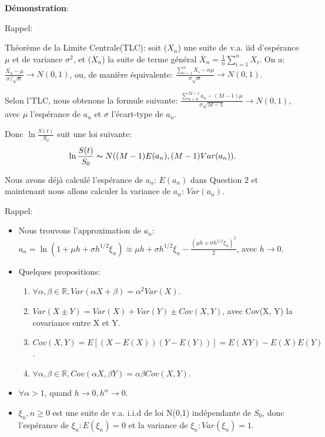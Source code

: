 \documentclass[a4paper,10pt]{report}
\begin{document}
\noindent \textbf{Démonstration}:
\par Rappel:
\par Théorème de la Limite Centrale(TLC): soit ($X_{n}$) une suite de v.a. iid d'espérance $\mu$ et de variance $\sigma^{2}$, et ($\overline X_{n}$) la suite de terme général $\overline X_{n} = \frac{1}{n} \sum_{i=1}^{n} X_{i}$. On a: $\frac{{\overline{X_{n}}} - \mu}{\sigma / \sqrt{n}} \rightarrow N(0,1)$, ou, de manière équivalente: $ \frac{\sum_{i=1}^{n}X_{i} - n\mu}{\sigma \sqrt{n}} \rightarrow N(0,1)$.
\par Selon l'TLC, nous obtenons la formule suivante: $\frac{\sum_{n=0}^{M-1} a_{n} - (M-1)\mu} {\sigma \sqrt{M-1}} \rightarrow N(0,1)$, avec $\mu$ l'espérance de $a_{n}$ et $\sigma$ l'écart-type de $a_{n}$.
\par Donc $\ln \frac{S(t)}{S_{0}}$ suit une loi suivante:
\begin{align*}
	\ln \frac{S(t)}{S_{0}} \thicksim N((M-1)E(a_{n}), (M-1)Var(a_{n})).
\end{align*}
\par Nous avons déjà calculé l'espérance de $a_{n}$: $E(a_{n})$ dans Question 2 et maintenant nous allons calculer la variance de $a_{n}$: $Var(a_{n})$.
\par Rappel: 
\begin{itemize}
	\item Nous trouvons l'approximation de $a_{n}$: $a_{n} = \ln (1 + \mu h + \sigma h^{1/2} \xi_{n}) \approx \mu h +\sigma h^{1/2} \xi_{n} - \frac{(\mu h + \sigma h^{1/2} \xi_{n})^{2}}{2}$, avec $h \rightarrow 0$.
	\item Quelques propositions:
	\begin{enumerate}
		\item $\forall \alpha, \beta \in \mathbb{R}, Var(\alpha X + \beta) = \alpha^{2} Var(X)$.
		\item $Var(X \pm Y) = Var(X) + Var(Y) \pm Cov(X, Y)$, avec Cov(X, Y) la covariance entre X et Y.
		\item $Cov(X, Y) = E[(X - E(X))(Y - E(Y))] = E(XY) - E(X)E(Y)$.
		\item $\forall \alpha, \beta \in \mathbb{R},Cov(\alpha X, \beta Y) = \alpha \beta Cov(X,Y)$.
	\end{enumerate}
	\item $\forall \alpha > 1$, quand $h \rightarrow 0, h^{\alpha} \rightarrow 0$.
	\item $\xi_{n}, n \geq 0$ est une suite de v.a. i.i.d de loi N(0,1) indépendante de $S_{0}$, donc l'espérance de $\xi_{n}: E(\xi_{n}) = 0$ et la variance de $\xi_{n}: Var(\xi_{n}) = 1$.
\end{itemize}
\end{document}
